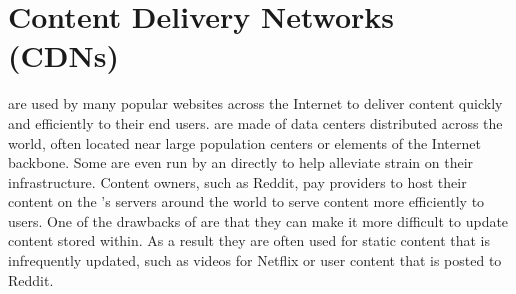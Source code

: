 \section{Content Delivery Networks (CDNs)}\label{sec:background_cdns}

\CDNs are used by many popular websites across the Internet to deliver content quickly and efficiently to their end users. \CDNs are made of data centers distributed across the world, often located near large population centers or elements of the Internet backbone. Some \cdns are even run by an \isp directly to help alleviate strain on their infrastructure. Content owners, such as Reddit, pay \cdn providers to host their content on the \cdn's servers around the world to serve content more efficiently to users. One of the drawbacks of \cdns are that they can make it more difficult to update content stored within. As a result they are often used for static content that is infrequently updated, such as videos for Netflix or user content that is posted to Reddit.